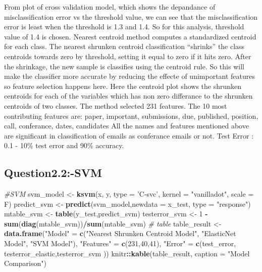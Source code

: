\documentclass[]{article}
\newenvironment{Shaded}{\begin{snugshade}}{\end{snugshade}}
\newcommand{\KeywordTok}[1]{\textcolor[rgb]{0.13,0.29,0.53}{\textbf{#1}}}
\newcommand{\DataTypeTok}[1]{\textcolor[rgb]{0.13,0.29,0.53}{#1}}
\newcommand{\DecValTok}[1]{\textcolor[rgb]{0.00,0.00,0.81}{#1}}
\newcommand{\StringTok}[1]{\textcolor[rgb]{0.31,0.60,0.02}{#1}}
\newcommand{\CommentTok}[1]{\textcolor[rgb]{0.56,0.35,0.01}{\textit{#1}}}
\newcommand{\OperatorTok}[1]{\textcolor[rgb]{0.81,0.36,0.00}{\textbf{#1}}}
\newcommand{\NormalTok}[1]{#1}
\begin{document}
From plot of cross validation model, which shows the depandance of
misclassification error vs the threshold value, we can see that the
misclassification error is least when the threshold is 1.3 and 1.4. So
for this analysis, threshold value of 1.4 is chosen. Nearest centroid
method computes a standardized centroid for each class. The nearest
shrunken centroid classification ``shrinks'' the class centroids towards
zero by threshold, setting it equal to zero if it hits zero. After the
shrinkage, the new sample is classifies using the centroid rule. So this
will make the classifier more accurate by reducing the effecte of
unimportant features so feature selection happens here. Here the
centroid plot shows the shrunken centroids for each of the variables
which has non zero differance to the shrunken centroids of two classes.
The method selected 231 features. The 10 most contributing features are:
paper, important, submissions, due, published, position, call,
conferance, dates, candidates All the names and features mentioned above
are significant in classification of emails as conferance emails or not.
Test Error : 0.1 - 10\% test error and 90\% accuracy.

\subsection{Question2.2:-SVM}\label{question2.2-svm}

\begin{Shaded}
\begin{Highlighting}[]
\CommentTok{#SVM}
\NormalTok{svm_model <-}\StringTok{ }\KeywordTok{ksvm}\NormalTok{(x, y, }\DataTypeTok{type =} \StringTok{'C-svc'}\NormalTok{, }\DataTypeTok{kernel =} \StringTok{"vanilladot"}\NormalTok{, }\DataTypeTok{scale =}\NormalTok{ F)}
\NormalTok{predict_svm <-}\StringTok{ }\KeywordTok{predict}\NormalTok{(svm_model,}\DataTypeTok{newdata =}\NormalTok{ x_test, }\DataTypeTok{type =} \StringTok{"response"}\NormalTok{)}
\NormalTok{mtable_svm <-}\StringTok{ }\KeywordTok{table}\NormalTok{(y_test,predict_svm)}
\NormalTok{testerror_svm <-}\StringTok{ }\DecValTok{1} \OperatorTok{-}\KeywordTok{sum}\NormalTok{(}\KeywordTok{diag}\NormalTok{(mtable_svm))}\OperatorTok{/}\KeywordTok{sum}\NormalTok{(mtable_svm)}
\CommentTok{# table}
\NormalTok{table_result <-}\StringTok{ }\KeywordTok{data.frame}\NormalTok{(}\StringTok{"Model"}\NormalTok{ =}\StringTok{ }\KeywordTok{c}\NormalTok{(}\StringTok{"Nearest Shrunken Centroid Model"}\NormalTok{,}
\StringTok{"ElasticNet Model"}\NormalTok{, }\StringTok{"SVM Model"}\NormalTok{), }\StringTok{"Features"}\NormalTok{ =}\StringTok{ }\KeywordTok{c}\NormalTok{(}\DecValTok{231}\NormalTok{,}\DecValTok{40}\NormalTok{,}\DecValTok{41}\NormalTok{),}
\StringTok{"Error"}\NormalTok{ =}\StringTok{ }\KeywordTok{c}\NormalTok{(test_error, testerror_elastic,testerror_svm ))}
\NormalTok{knitr}\OperatorTok{::}\KeywordTok{kable}\NormalTok{(table_result, }\DataTypeTok{caption =} \StringTok{"Model Comparison"}\NormalTok{)}
\end{Highlighting}
\end{Shaded}
\end{document}
